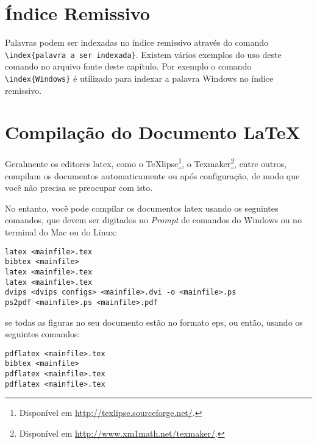 \section{Índice Remissivo}\label{sec:indice}

Palavras podem ser indexadas no índice remissivo através do comando \verb|\index{palavra a ser indexada}|. Existem vários exemplos do uso deste comando no arquivo fonte deste capítulo. Por exemplo o comando \verb|\index{Windows}| é utilizado para indexar a palavra Windows no índice remissivo.

\section{Compilação do Documento \LaTeX}\label{sec:compilar}

Geralmente os editores \gls{latex}, como o TeXlipse\footnote{Disponível em \url{http://texlipse.sourceforge.net/}.}, o Texmaker\footnote{Disponível em \url{http://www.xm1math.net/texmaker/}.}, entre outros, compilam os documentos automaticamente ou após configuração, de modo que você não precisa se preocupar com isto.

No entanto, você pode compilar os documentos \gls{latex} usando os seguintes comandos, que devem ser digitados no \textit{Prompt} de comandos do Windows ou no terminal do Mac ou do Linux:

\begin{SingleSpacing}%
\begin{verbatim}
latex <mainfile>.tex
bibtex <mainfile>
latex <mainfile>.tex
latex <mainfile>.tex
dvips <dvips configs> <mainfile>.dvi -o <mainfile>.ps
ps2pdf <mainfile>.ps <mainfile>.pdf
\end{verbatim}
\end{SingleSpacing}

\noindent se todas as figuras no seu documento estão no formato \gls{eps}, ou então, usando os seguintes comandos:

\begin{SingleSpacing}%
\begin{verbatim}
pdflatex <mainfile>.tex
bibtex <mainfile>
pdflatex <mainfile>.tex
pdflatex <mainfile>.tex
\end{verbatim}
\end{SingleSpacing}

